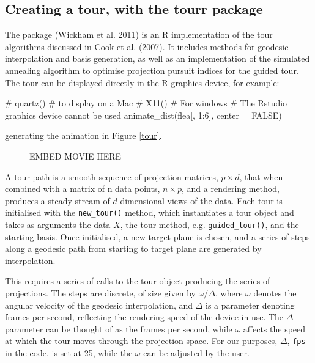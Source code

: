\subsection{Creating a tour, with the tourr
package}\label{creating-a-tour-with-the-tourr-package}

The  package (Wickham et al. 2011) is an R implementation of
the tour algorithms discussed in Cook et al. (2007). It includes methods
for geodesic interpolation and basis generation, as well as an
implementation of the simulated annealing algorithm to optimise
projection pursuit indices for the guided tour. The tour can be
displayed directly in the R graphics device, for example:

\begin{Schunk}
\begin{Sinput}
# quartz() # to display on a Mac
# X11() # For windows
# The Rstudio graphics device cannot be used
animate_dist(flea[, 1:6], center = FALSE)
\end{Sinput}
\end{Schunk}

generating the animation in Figure \ref{tour}.

\begin{figure}[ht]
EMBED MOVIE HERE
\end{figure}

A tour path is a smooth sequence of projection matrices, \(p\times d\),
that when combined with a matrix of n data points, \(n\times p\), and a
rendering method, produces a steady stream of \(d\)-dimensional views of
the data. Each tour is initialised with the \texttt{new\_tour()} method,
which instantiates a tour object and takes as arguments the data \(X\),
the tour method, e.g. \texttt{guided\_tour()}, and the starting basis.
Once initialised, a new target plane is chosen, and a series of steps
along a geodesic path from starting to target plane are generated by
interpolation.

This requires a series of calls to the tour object producing the series
of projections. The steps are discrete, of size given by
\(\omega/\Delta\), where \(\omega\) denotes the angular velocity of the
geodesic interpolation, and \(\Delta\) is a parameter denoting frames
per second, reflecting the rendering speed of the device in use. The
\(\Delta\) parameter can be thought of as the frames per second, while
\(\omega\) affects the speed at which the tour moves through the
projection space. For our purposes, \(\Delta\), \texttt{fps} in the
code, is set at 25, while the \(\omega\) can be adjusted by the user.

